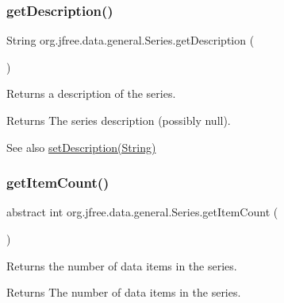 \subsubsection{\texorpdfstring{get\+Description()}{getDescription()}}
{\footnotesize\ttfamily String org.\+jfree.\+data.\+general.\+Series.\+get\+Description (\begin{DoxyParamCaption}{ }\end{DoxyParamCaption})}

Returns a description of the series.

\begin{DoxyReturn}{Returns}
The series description (possibly {\ttfamily null}).
\end{DoxyReturn}
\begin{DoxySeeAlso}{See also}
\mbox{\hyperlink{classorg_1_1jfree_1_1data_1_1general_1_1_series_af5fefb218fda90ab6a957141e7b7e2e3}{set\+Description(\+String)}} 
\end{DoxySeeAlso}
\mbox{\label{classorg_1_1jfree_1_1data_1_1general_1_1_series_a702b874ef23df4e06eeda075fd432594}} 
\subsubsection{\texorpdfstring{get\+Item\+Count()}{getItemCount()}}
{\footnotesize\ttfamily abstract int org.\+jfree.\+data.\+general.\+Series.\+get\+Item\+Count (\begin{DoxyParamCaption}{ }\end{DoxyParamCaption})\hspace{0.3cm}{\ttfamily [abstract]}}

Returns the number of data items in the series.

\begin{DoxyReturn}{Returns}
The number of data items in the series. 
\end{DoxyReturn}
\mbox{\label{classorg_1_1jfree_1_1data_1_1general_1_1_series_a3cc77859046ad99ea9f01aea606f8165}} 
